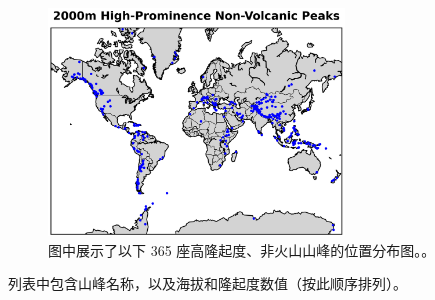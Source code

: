 \documentclass[10pt,twocolumn,letterpaper]{article}
\begin{document}
\begin{figure}[t]
\begin{center}
\includegraphics[width=0.7\textwidth]{peaks.png}
\end{center}
   \caption{图中展示了以下 365 座高隆起度、非火山山峰的位置分布图。\cite{62}。}
   \label{fig:22}
\end{figure}

列表中包含山峰名称，以及海拔和隆起度数值（按此顺序排列）。
\end{document}
